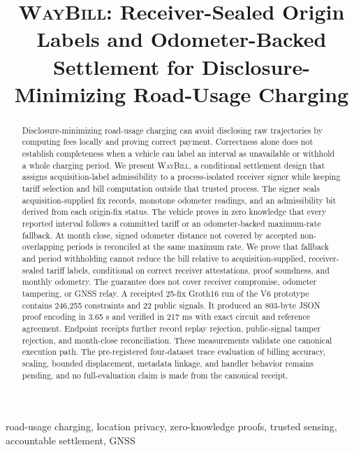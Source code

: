 \documentclass[conference]{IEEEtran}
\theoremstyle{plain}
\theoremstyle{definition}
\newcommand{\system}{\textsc{WayBill}}
\begin{document}
\title{\system: Receiver-Sealed Origin Labels and Odometer-Backed Settlement for Disclosure-Minimizing Road-Usage Charging}

\author{
}

\maketitle

\begin{abstract}
Disclosure-minimizing road-usage charging can avoid disclosing raw trajectories by computing
fees locally and proving correct payment. Correctness alone does not establish
completeness when a vehicle can label an interval as unavailable or withhold a
whole charging period. We present \system, a conditional settlement design
that assigns acquisition-label admissibility to a process-isolated receiver signer while
keeping tariff selection and bill computation outside that trusted process.
The signer seals acquisition-supplied fix records, monotone odometer readings,
and an admissibility bit derived from each origin-fix status. The vehicle proves in zero
knowledge that every reported interval follows a committed tariff or an
odometer-backed maximum-rate fallback. At month close, signed odometer distance
not covered by accepted non-overlapping periods is reconciled at the same
maximum rate. We prove that fallback and period withholding cannot reduce the
bill relative to acquisition-supplied, receiver-sealed tariff labels, conditional on correct
receiver attestations, proof soundness, and monthly odometry. The guarantee
does not cover receiver compromise, odometer tampering, or GNSS relay. A
receipted 25-fix Groth16 run of the V6 prototype contains 246,255 constraints
and 22 public signals. It produced an 803-byte JSON proof encoding in 3.65 s and verified in
217 ms with exact circuit and reference agreement. Endpoint receipts further
record replay rejection, public-signal tamper rejection, and month-close
reconciliation. These measurements validate one canonical execution path. The
pre-registered four-dataset trace evaluation of billing accuracy, scaling,
bounded displacement, metadata linkage, and handler behavior remains pending, and no
full-evaluation claim is made from the canonical receipt.
\end{abstract}

\begin{IEEEkeywords}
road-usage charging, location privacy, zero-knowledge proofs, trusted sensing,
accountable settlement, GNSS
\end{IEEEkeywords}
\end{document}
